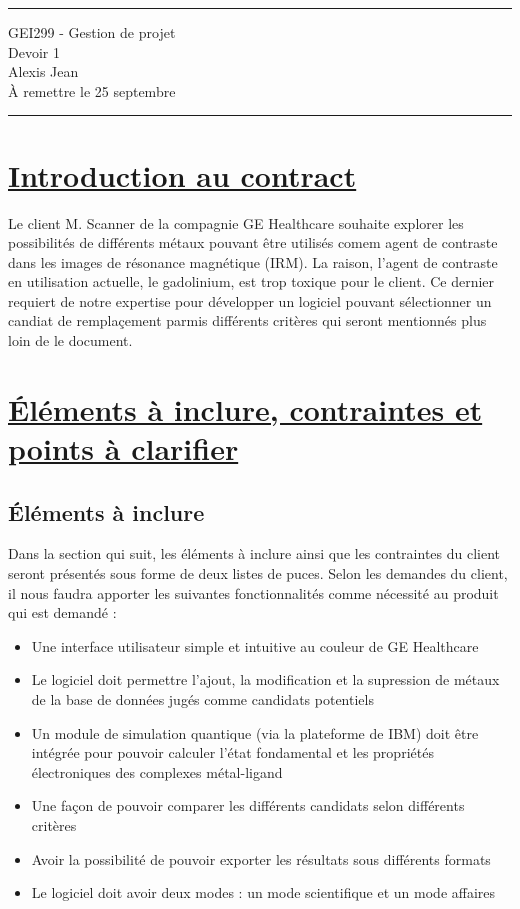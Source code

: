 \documentclass[11pt]{article}
\begin{document}
\hrule

\begin{center}
  {\Large GEI299 - Gestion de projet} \\ \vspace{5mm}
  {\LARGE\sffamily Devoir 1} \\
  Alexis Jean \\
  À remettre le 25 septembre
\end{center}

\hrule


\section{\underline{Introduction au contract}}
Le client M. Scanner de la compagnie GE Healthcare souhaite explorer les possibilités de différents métaux pouvant être utilisés comem agent de contraste dans les images de résonance magnétique (IRM). La raison, l'agent de contraste en utilisation actuelle, le gadolinium, est trop toxique pour le client. Ce dernier requiert de notre expertise pour développer un logiciel pouvant sélectionner un candiat de remplaçement parmis différents critères qui seront mentionnés plus loin de le document.


\section{\underline{Éléments à inclure, contraintes et points à clarifier}}

\subsection{Éléments à inclure}
Dans la section qui suit, les éléments à inclure ainsi que les contraintes du client seront présentés sous forme de deux listes de puces. Selon les demandes du client, il nous faudra apporter les suivantes fonctionnalités comme nécessité au produit qui est demandé :

\begin{itemize}[label=\textbullet]
  \item Une interface utilisateur simple et intuitive au couleur de GE Healthcare
  \item Le logiciel doit permettre l'ajout, la modification et la supression de métaux de la base de données jugés comme candidats potentiels
  \item Un module de simulation quantique (via la plateforme de IBM) doit être intégrée pour pouvoir calculer l’état fondamental et les propriétés électroniques des complexes métal-ligand
  \item Une façon de pouvoir comparer les différents candidats selon différents critères
  \item Avoir la possibilité de pouvoir exporter les résultats sous différents formats
  \item Le logiciel doit avoir deux modes : un mode scientifique et un mode affaires
\end{itemize}
\end{document}
